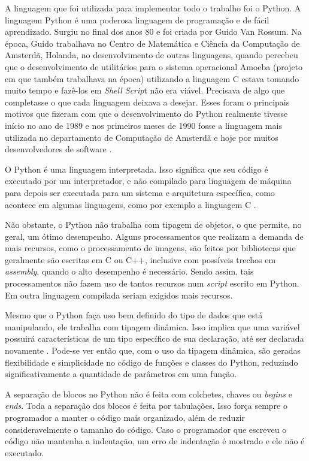 \documentclass[
	12pt,				%
	twoside,			%
	a4paper,			%
	english,			%
	french,				%
	spanish,			%
	brazil				%
	]{abntex2}
\begin{document}
A linguagem que foi utilizada para implementar todo o trabalho foi o
Python. A linguagem Python é uma poderosa linguagem de programação e de
fácil aprendizado. Surgiu no final dos anos 80 e foi criada por Guido
Van Rossum. Na época, Guido trabalhava no Centro de Matemática e Ciência
da Computação de Amsterdã, Holanda, no desenvolvimento de outras
linguagens, quando percebeu que o desenvolvimento de utilitários para o
sistema operacional Amoeba (projeto em que também trabalhava na época)
utilizando a linguagem C estava tomando muito tempo e fazê-los em
\emph{Shell Scrip}t não era viável. Precisava de algo que completasse o
que cada linguagem deixava a desejar. Esses foram o principais motivos
que fizeram com que o desenvolvimento do Python realmente tivesse início
no ano de 1989 e nos primeiros meses de 1990 fosse a linguagem mais
utilizada no departamento de Computação de Amsterdã e hoje por muitos
desenvolvedores de software \cite{SILVA}.

O Python é uma linguagem interpretada. Isso significa que seu código é
executado por um interpretador, e não compilado para linguagem de
máquina para depois ser executada para um sistema e arquitetura
específica, como acontece em algumas linguagens, como por exemplo a
linguagem C \cite{MAGNUN}.

Não obstante, o Python não trabalha com tipagem de objetos, o que
permite, no geral, um ótimo desempenho. Alguns processamentos que
realizam a demanda de mais recursos, como o processamento de imagens,
são feitos por bibliotecas que geralmente são escritas em C ou C++,
inclusive com possíveis trechos em \emph{assembly}, quando o alto
desempenho é necessário. Sendo assim, tais processamentos não fazem uso
de tantos recursos num \emph{script} escrito em Python. Em outra
linguagem compilada seriam exigidos mais recursos.

Mesmo que o Python faça uso bem definido do tipo de dados que está
manipulando, ele trabalha com tipagem dinâmica. Isso implica que uma
variável possuirá características de um tipo específico de sua
declaração, até ser declarada novamente \cite{MAGNUN}. Pode-se ver então
que, com o uso da tipagem dinâmica, são geradas flexibilidade e
simplicidade no código de funções e classes do Python, reduzindo
significativamente a quantidade de parâmetros em uma função.

A separação de blocos no Python não é feita com colchetes, chaves ou
\emph{begins} e \emph{ends}. Toda a separação dos blocos é feita por
tabulações. Isso força sempre o programador a manter o código mais
organizado, além de reduzir consideravelmente o tamanho do código. Caso
o programador que escreveu o código não mantenha a indentação, um erro
de indentação é mostrado e ele não é executado.
\end{document}
